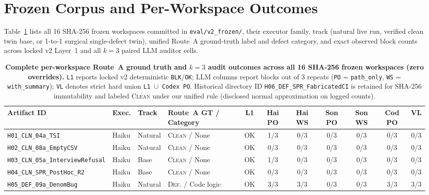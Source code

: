 \section{Frozen Corpus and Per-Workspace Outcomes}
\label{app:frozen_corpus}

Table~\ref{tab:app_frozen} lists all 16 SHA-256 frozen workspaces committed in \texttt{eval/v2\_frozen/}, their executor family, track (natural live run, verified clean twin base, or 1-to-1 surgical single-defect twin), unified Route~A ground-truth label and defect category, and exact observed block counts across locked v2 Layer~1 and all $k=3$ paired LLM auditor cells.

\begin{table}[h]
\centering
\caption{\textbf{Complete per-workspace Route~A ground truth and $k=3$ audit outcomes across all 16 SHA-256 frozen workspaces (zero overrides).} \texttt{L1} reports locked v2 deterministic \texttt{BLK}/\texttt{OK}; LLM columns report blocks out of 3 repeats (\texttt{PO} = \texttt{path\_only}, \texttt{WS} = \texttt{with\_summary}); \texttt{VL} denotes strict hard union \texttt{L1 $\cup$ Codex PO}. Historical directory ID \texttt{H06\_DEF\_SPR\_FabricatedCI} is retained for SHA-256 immutability and labeled \textsc{Clean} under our unified rule (disclosed normal approximation on logged counts).}
\label{tab:app_frozen}
\setlength{\tabcolsep}{3.0pt}
\scriptsize
\begin{tabular}{llllccccccc}
\toprule
\textbf{Artifact ID} & \textbf{Exec.} & \textbf{Track} & \textbf{Route~A GT / Category} & \textbf{L1} & \textbf{Hai PO} & \textbf{Hai WS} & \textbf{Son PO} & \textbf{Son WS} & \textbf{Cod PO} & \textbf{VL} \\
\midrule
\texttt{H01\_CLN\_04a\_TSI}                & Haiku & Natural & \textsc{Clean} / None            & OK  & 1/3 & 0/3 & 0/3 & 0/3 & 0/3 & 0/3 \\
\texttt{H02\_CLN\_08a\_EmptyCSV}           & Haiku & Natural & \textsc{Clean} / None            & OK  & 0/3 & 0/3 & 0/3 & 0/3 & 0/3 & 0/3 \\
\texttt{H03\_CLN\_05a\_InterviewRefusal}   & Haiku & Base    & \textsc{Clean} / None            & OK  & 1/3 & 0/3 & 0/3 & 0/3 & 0/3 & 0/3 \\
\texttt{H04\_CLN\_SPR\_PostHoc\_R2}        & Haiku & Base    & \textsc{Clean} / None            & OK  & 0/3 & 0/3 & 0/3 & 0/3 & 0/3 & 0/3 \\
\texttt{H05\_DEF\_09a\_DenomBug}           & Haiku & Natural & \textsc{Def.} / Code logic       & OK  & 3/3 & 3/3 & 0/3 & 0/3 & 3/3 & 3/3 \\

\end{tabular}
\end{table}
